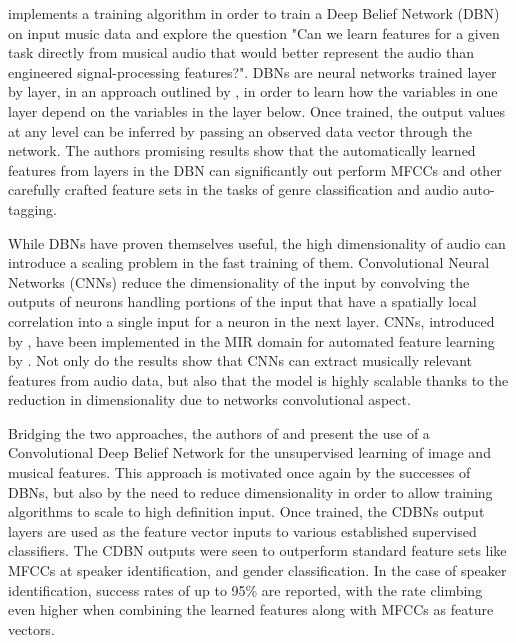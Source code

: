 \documentclass[twoside]{article}
\begin{document}
\begin{multicols}{2}
\citet{Hamel2010LearningFeatures} implements a training algorithm in order to train a Deep Belief Network (DBN) on input music data and explore the question "Can we learn features for a given task directly from musical audio that would better represent the audio than engineered signal-processing features?". DBNs are neural networks trained layer by layer, in an approach outlined by \citet{hinton2006fast}, in order to learn how the variables in one layer depend on the variables in the layer below. Once trained, the output values at any level can be inferred by passing an observed data vector through the network. The authors promising results show that the automatically learned features from layers in the DBN can significantly out perform MFCCs and other carefully crafted feature sets in the tasks of genre classification and audio auto-tagging.

While DBNs have proven themselves useful, the high dimensionality of audio can introduce a scaling problem in the fast training of them. Convolutional Neural Networks (CNNs) reduce the dimensionality of the input by convolving the outputs of neurons handling portions of the input that have a spatially local correlation into a single input for a neuron in the next layer. CNNs, introduced by \citet{atlas1988artificial}, have been implemented in the MIR domain for automated feature learning by \citet{li2010automatic}. Not only do the results show that CNNs can extract musically relevant features from audio data, but also that the model is highly scalable thanks to the reduction in dimensionality due to networks convolutional aspect.

Bridging the two approaches, the authors of \citet{lee2009convolutional} and \citet{lee2009unsupervised} present the use of a Convolutional Deep Belief Network for the unsupervised learning of image and musical features. This approach is motivated once again by the successes of DBNs, but also by the need to reduce dimensionality in order to allow training algorithms to scale to high definition input. Once trained, the CDBNs output layers are used as the feature vector inputs to various established supervised classifiers. The CDBN outputs were seen to outperform standard feature sets like MFCCs at speaker identification, and gender classification. In the case of speaker identification, success rates of up to 95\% are reported, with the rate climbing even higher when combining the learned features along with MFCCs as feature vectors.



\end{multicols}
\end{document}
